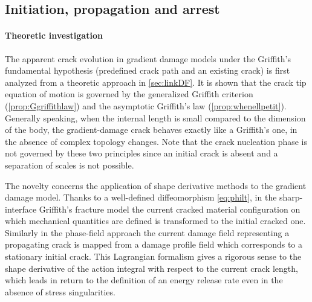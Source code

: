 \subsection{Initiation, propagation and arrest}
\paragraph{Theoretic investigation} The apparent crack evolution in gradient damage models under the Griffith's fundamental hypothesis (predefined crack path and an existing crack) is first analyzed from a theoretic approach in \cref{sec:linkDF}. It is shown that the crack tip equation of motion is governed by the generalized Griffith criterion (\cref{prop:Ggriffithlaw}) and the asymptotic Griffith's law (\cref{prop:whenellpetit}). Generally speaking, when the internal length is small compared to the dimension of the body, the gradient-damage crack behaves exactly like a Griffith's one, in the absence of complex topology changes. Note that the crack nucleation phase is not governed by these two principles since an initial crack is absent and a separation of scales is not possible.

The novelty concerns the application of shape derivative methods \cite{Destuynder:1981} to the gradient damage model. Thanks to a well-defined diffeomorphism \eqref{eq:philt}, in the sharp-interface Griffith's fracture model the current cracked material configuration on which mechanical quantities are defined is transformed to the initial cracked one. Similarly in the phase-field approach the current damage field representing a propagating crack is mapped from a damage profile field which corresponds to a stationary initial crack. This Lagrangian formalism gives a rigorous sense to the shape derivative of the action integral with respect to the current crack length, which leads in return to the definition of an energy release rate even in the absence of stress singularities.

